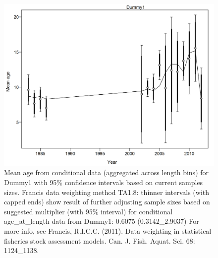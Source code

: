 \documentclass[12pt,]{article}
\begin{document}
\begin{figure}
\centering
\includegraphics{./r4ss/plots_mod1/comp_condAALfit_data_weighting_TA1.8_condAgeDummy1.png}
\caption{Mean age from conditional data (aggregated across length bins)
for Dummy1 with 95\% confidence intervals based on current samples
sizes. Francis data weighting method TA1.8: thinner intervals (with
capped ends) show result of further adjusting sample sizes based on
suggested multiplier (with 95\% interval) for conditional
age\_at\_length data from Dummy1: 0.6075 (0.3142\_2.9037) For more info,
see Francis, R.I.C.C. (2011). Data weighting in statistical fisheries
stock assessment models. Can. J. Fish. Aquat. Sci. 68: 1124\_1138.
\label{fig:mod1_16_comp_condAALfit_data_weighting_TA1.8_condAgeDummy1}}
\end{figure}
\end{document}
